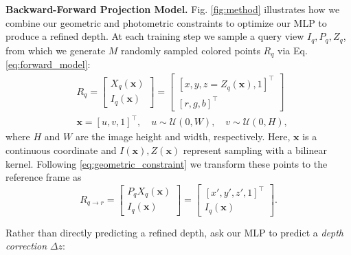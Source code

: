 \vspace{0.5em}\noindent\textbf{Backward-Forward Projection Model.}\hspace{0.1em} Fig. \ref{fig:method} illustrates how we combine our geometric and photometric constraints to optimize our MLP to produce a refined depth.
At each training step we sample a query view $I_q, P_q, Z_q$, from which we generate $M$ randomly sampled colored points $R_q$ via Eq. \ref{eq:forward_model}:
\begin{align}\label{eq:ray_generation}
    &R_q =  
\left[\begin{array}{c}
X_q(\bm{x}) \\
I_q(\bm{x})
\end{array}\right]
=
\left[\begin{array}{c}
\left[x,y,z=Z_q(\bm{x}),1\right]^\top \\
\left[r,g,b\right]^\top
\end{array}\right]
\nonumber
\\
&\bm{x} = \left[u,v,1\right]^\top, \quad u \sim \mathcal{U}(0,W), \quad v \sim \mathcal{U}(0,H),
\end{align}
where $H$ and $W$ are the image height and width, respectively. Here, $\bm{x}$ is a continuous coordinate and $I(\bm{x}), Z(\bm{x})$ represent sampling with a bilinear kernel. Following \eqref{eq:geometric_constraint} we transform these points to the reference frame as
\begin{equation}\label{eq:project_to_ref}
    R_{q \rightarrow r} =
\left[\begin{array}{c}
P_q X_q(\bm{x}) \\
I_q(\bm{x})
\end{array}\right]
=
\left[\begin{array}{c}
\left[x',y',z',1\right]^\top \\
I_q(\bm{x})
\end{array}\right]
.
\end{equation}

\noindent Rather than directly predicting a refined depth, ask our MLP to predict a \emph{depth correction} $\Delta z$:

